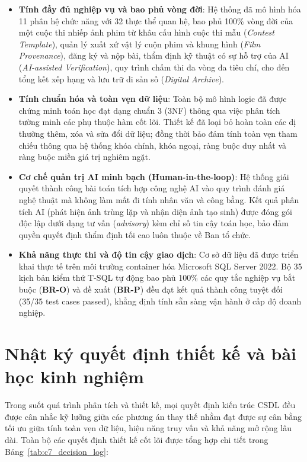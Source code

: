 \begin{itemize}
    \item \textbf{Tính đầy đủ nghiệp vụ và bao phủ vòng đời}: Hệ thống đã mô hình hóa 11 phân hệ chức năng với 32 thực thể quan hệ, bao phủ 100\% vòng đời của một cuộc thi nhiếp ảnh phim từ khâu cấu hình cuộc thi mẫu (\textit{Contest Template}), quản lý xuất xứ vật lý cuộn phim và khung hình (\textit{Film Provenance}), đăng ký và nộp bài, thẩm định kỹ thuật có sự hỗ trợ của AI (\textit{AI-assisted Verification}), quy trình chấm thi đa vòng đa tiêu chí, cho đến tổng kết xếp hạng và lưu trữ di sản số (\textit{Digital Archive}).
    \item \textbf{Tính chuẩn hóa và toàn vẹn dữ liệu}: Toàn bộ mô hình logic đã được chứng minh toán học đạt dạng chuẩn 3 (3NF) thông qua việc phân tích tường minh các phụ thuộc hàm cốt lõi. Thiết kế đã loại bỏ hoàn toàn các dị thường thêm, xóa và sửa đổi dữ liệu; đồng thời bảo đảm tính toàn vẹn tham chiếu thông qua hệ thống khóa chính, khóa ngoại, ràng buộc duy nhất và ràng buộc miền giá trị nghiêm ngặt.
    \item \textbf{Cơ chế quản trị AI minh bạch (Human-in-the-loop)}: Hệ thống giải quyết thành công bài toán tích hợp công nghệ AI vào quy trình đánh giá nghệ thuật mà không làm mất đi tính nhân văn và công bằng. Kết quả phân tích AI (phát hiện ảnh trùng lặp và nhận diện ảnh tạo sinh) được đóng gói độc lập dưới dạng tư vấn (\textit{advisory}) kèm chỉ số tin cậy toán học, bảo đảm quyền quyết định thẩm định tối cao luôn thuộc về Ban tổ chức.
    \item \textbf{Khả năng thực thi và độ tin cậy giao dịch}: Cơ sở dữ liệu đã được triển khai thực tế trên môi trường container hóa Microsoft SQL Server 2022. Bộ 35 kịch bản kiểm thử T-SQL tự động bao phủ 100\% các quy tắc nghiệp vụ bắt buộc (\textbf{BR-O}) và đề xuất (\textbf{BR-P}) đều đạt kết quả thành công tuyệt đối (35/35 test cases passed), khẳng định tính sẵn sàng vận hành ở cấp độ doanh nghiệp.
\end{itemize}

\section{Nhật ký quyết định thiết kế và bài học kinh nghiệm}
\label{s:c7_decision_log}

Trong suốt quá trình phân tích và thiết kế, mọi quyết định kiến trúc CSDL đều được cân nhắc kỹ lưỡng giữa các phương án thay thế nhằm đạt được sự cân bằng tối ưu giữa tính toàn vẹn dữ liệu, hiệu năng truy vấn và khả năng mở rộng lâu dài. Toàn bộ các quyết định thiết kế cốt lõi được tổng hợp chi tiết trong Bảng~\ref{tab:c7_decision_log}:


